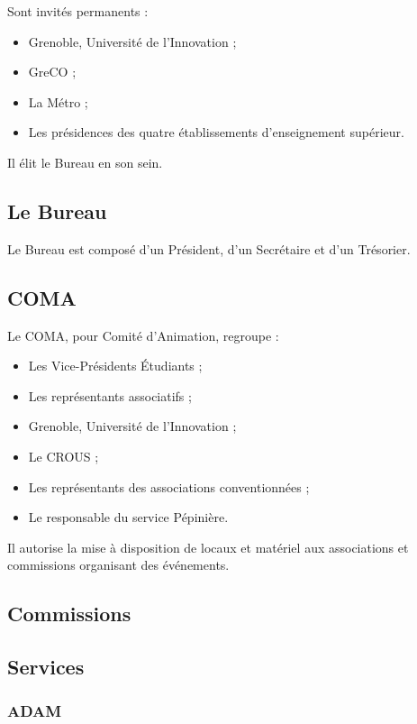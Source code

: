 Sont invités permanents :

\begin{itemize}
\item Grenoble, Université de l'Innovation ;
\item GreCO ;
\item La Métro ;
\item Les présidences des quatre établissements d'enseignement supérieur.
\end{itemize}

Il élit le Bureau en son sein.

\subsection{Le Bureau}

Le Bureau est composé d'un Président, d'un Secrétaire et d'un Trésorier.

\subsection{COMA}

Le COMA, pour Comité d'Animation, regroupe :

\begin{itemize}
\item Les Vice-Présidents Étudiants ;
\item Les représentants associatifs ;
\item Grenoble, Université de l'Innovation ;
\item Le CROUS ;
\item Les représentants des associations conventionnées ;
\item Le responsable du service Pépinière.
\end{itemize}

Il autorise la mise à disposition de locaux et matériel aux associations
et commissions organisant des événements.

\subsection{Commissions}

\subsection{Services}

\subsubsection{ADAM}

